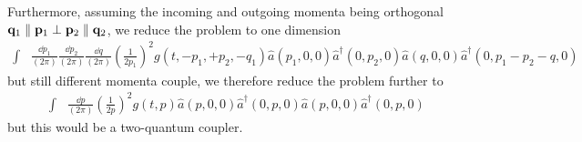 Furthermore, assuming the incoming and outgoing momenta being orthogonal $\vb{q}_1\parallel\vb{p}_1\perp\vb{p}_2 \parallel\vb{q}_2$, we reduce the problem to one dimension
\begin{equation}
	\begin{split}
		\int
		&
		\frac{\dd{p_1}}{(2\pi)}
		\frac{\dd{p_2}}{(2\pi)}
		\frac{\dd{q}}{(2\pi)}
		\left(
			\frac{1}{2p_1}
		\right)^2
		g(t,-p_1,+p_2,-q_1)
		\hat{a}(p_1,0,0)
		\hat{a}^\dagger(0,p_2,0)
		\hat{a}(q,0,0)
		\hat{a}^\dagger(0,p_1-p_2-q,0)
	\end{split}
\end{equation}
but still different momenta couple, we therefore reduce the problem further to
\begin{equation}
	\begin{split}
		\int
		&
		\frac{\dd{p}}{(2\pi)}
		\left(
			\frac{1}{2p}
		\right)^2
		g(t,p)
		\hat{a}(p,0,0)
		\hat{a}^\dagger(0,p,0)
		\hat{a}(p,0,0)
		\hat{a}^\dagger(0,p,0)
	\end{split}
\end{equation}
but this would be a two-quantum coupler.